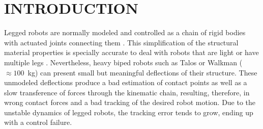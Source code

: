\documentclass[letterpaper, 10 pt, conference]{ieeeconf}  %
\begin{document}
\begin{abstract}


\end{abstract}


\section{INTRODUCTION}

Legged robots are normally modeled and controlled as a chain of rigid bodies with actuated joints connecting them \cite{Handbook}. This simplification of the structural material properties is specially accurate to deal with robots that are light or have multiple legs \cite{Leziart2021_Solo12}. Nevertheless, heavy biped robots such as Talos or Walkman ($\approx 100$~kg) can present small but meaningful deflections of their structure. These unmodeled deflections produce a bad estimation of contact points as well as a slow transference of forces through the kinematic chain, resulting, therefore, in wrong contact forces and a bad tracking of the desired robot motion. Due to the unstable dynamics of legged robots, the tracking error tends to grow, ending up with a control failure.
\end{document}
